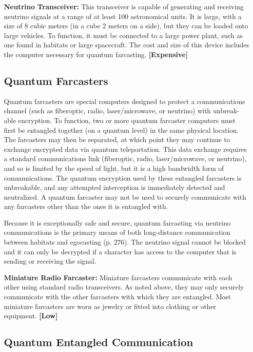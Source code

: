 \textbf{Neutrino Transceiver:} This transceiver is capable of 
generating and receiving neutrino signals at a range of 
at least 100 astronomical units. It is large, with a size 
of 8 cubic meters (in a cube 2 meters on a side), but 
they can be loaded onto large vehicles. To function, it 
must be connected to a large power plant, such as one 
found in habitats or large spacecraft. The cost and 
size of this device includes the computer necessary for 
quantum farcasting. \textbf{[Expensive]}

\subsection{Quantum Farcasters}

Quantum farcasters are special computers designed to 
protect a communications channel (such as fiberoptic, 
radio, laser/microwave, or neutrino) with unbreak-
able encryption. To function, two or more quantum 
farcaster computers must first be entangled together 
(on a quantum level) in the same physical location. 
The farcasters may then be separated, at which point 
they may continue to exchange encrypted data via 
quantum teleportation. This data exchange requires 
a standard communications link (fiberoptic,  radio, 
laser/microwave, or neutrino), and so is limited by 
the speed of light, but it is a high bandwidth form 
of communications. The quantum encryption used 
by these entangled farcasters is unbreakable, and any 
attempted interception is immediately detected and 
neutralized. A quantum farcaster may not be used to 
securely communicate with any farcasters other than 
the ones it is entangled with.

Because it is exceptionally safe and secure, quantum 
farcasting via neutrino communications is the primary 
means of both long-distance communication between 
habitats and egocasting (p. 276). The neutrino signal 
cannot be blocked and it can only be decrypted if a 
character has access to the computer that is sending 
or receiving the signal.

\textbf{Miniature Radio Farcaster: }Miniature farcasters 
communicate with each other using standard radio 
transceivers. As noted above, they may only securely 
communicate with the other farcasters with which they 
are entangled. Most miniature farcasters are worn as 
jewelry or fitted into clothing or other equipment. \textbf{[Low]}

\subsection{Quantum Entangled Communication}

